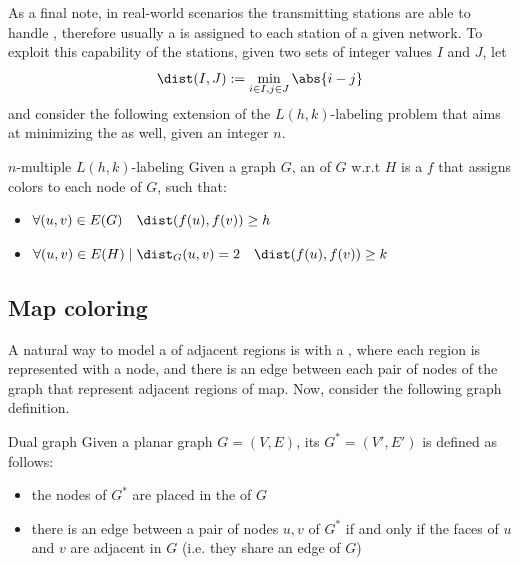 \documentclass[a4paper, 12pt]{report}
\begin{document}
    As a final note, in real-world scenarios the transmitting stations are able to handle , therefore usually a  is assigned to each station of a given network. To exploit this capability of the stations, given two sets of integer values $I$ and $J$, let $$\dist(I, J) := \min_{i \in I, j \in J}{\abs{i - j}}$$ and consider the following extension of the $L(h, k)$-labeling problem that aims at minimizing the  as well, given an integer $n$.

    \begin{frameddefn}{$n$-multiple $L(h,k)$-labeling}
        Given a graph $G$, an  of $G$ w.r.t $H$ is a  $f$ that assigns  colors to each node of $G$, such that:

        \begin{itemize}
            \item $\forall (u, v) \in E(G) \quad \dist(f(u), f(v)) \ge h$
            \item $\forall (u, v) \in E(H) \mid \dist_G(u, v) = 2 \quad \dist(f(u), f(v)) \ge k$
        \end{itemize}
    \end{frameddefn}

    \subsection{Map coloring}

    A natural way to model a  of adjacent regions is with a , where each region is represented with a node, and there is an edge between each pair of nodes of the graph that represent adjacent regions of map. Now, consider the following graph definition.

    \begin{frameddefn}{Dual graph}
        Given a planar graph $G = (V, E)$, its  $G^* = (V', E')$ is defined as follows:

        \begin{itemize}
            \item the nodes of $G^*$ are placed in the  of $G$
            \item there is an edge between a pair of nodes $u, v$ of $G^*$ if and only if the faces of $u$ and $v$ are adjacent in $G$ (i.e. they share an edge of $G$)
        \end{itemize}
    \end{frameddefn}
\end{document}
